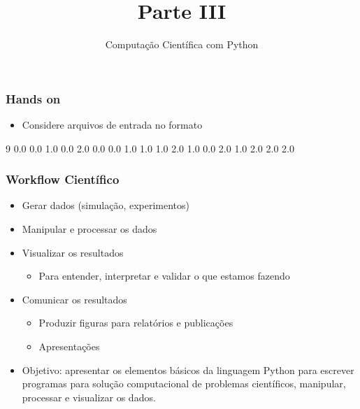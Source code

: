 \documentclass[12pt,t,graphics]{beamer}
\newcommand{\ft}[1]{\frametitle{#1}}
\newcommand{\bi}{\begin{itemize}}
\newcommand{\ei}{\end{itemize}}
\begin{document}

\begin{frame}[fragile]
	\ft{\textbf{Hands on}}
	\bi
	\item Considere arquivos de entrada no formato
	\ei
	\begin{python}
9
0.0 0.0
1.0 0.0
2.0 0.0
0.0 1.0
1.0 1.0
2.0 1.0
0.0 2.0
1.0 2.0
2.0 2.0	
	\end{python}	
\end{frame}


\begin{frame}
  \title{Parte III}
  \subtitle{Computação Científica com Python}
  \date{}\author{}\institute{}\date{}
  \maketitle
\end{frame}


\begin{frame}[fragile]
  \ft{Workflow Científico}
  \bi
\item Gerar dados (simulação, experimentos)
\item Manipular e processar os dados
\item Visualizar os resultados
  \bi
\item Para entender, interpretar e validar o que
  estamos fazendo
  \ei
\item Comunicar os resultados
  \bi
\item Produzir figuras para relatórios e publicações
\item Apresentações
  \ei
\item Objetivo: apresentar os elementos básicos da
  linguagem Python para escrever programas para
  solução computacional de problemas científicos,
  manipular, processar e visualizar os dados.
  \ei
\end{frame}

\end{document}
